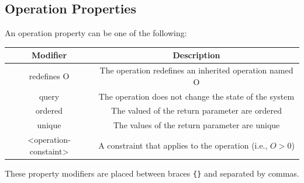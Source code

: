 \documentclass{article}
\begin{document}
\subsection{Operation Properties}
An operation property can be one of the following:
\begin{table}[H]
    \centering
    \begin{tabular}{c c}
        \toprule
        \textbf{Modifier}     & \textbf{Description}                                       \\
        \midrule
        redefines O           & The operation redefines an inherited operation named O     \\
        query                 & The operation does not change the state of the system      \\
        ordered               & The valued of the return parameter are ordered             \\
        unique                & The values of the return parameter are unique              \\
        <operation-constaint> & A constraint that applies to the operation (i.e., \(O>0\)) \\
        \bottomrule
    \end{tabular}
\end{table}
These property modifiers are placed between braces \lstinline!{}! and separated by commas.
\end{document}

